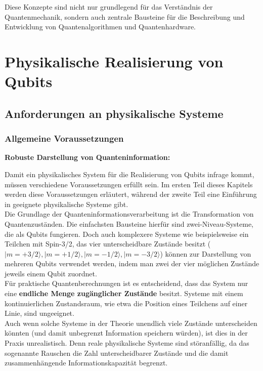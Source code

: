 Diese Konzepte sind nicht nur grundlegend für das Verständnis der Quantenmechanik, sondern auch zentrale Bausteine für die Beschreibung und Entwicklung von Quantenalgorithmen und Quantenhardware.

\section{Physikalische Realisierung von Qubits }
\subsection{Anforderungen an physikalische Systeme }
\subsubsection{Allgemeine Voraussetzungen}

\textbf{Robuste Darstellung von Quanteninformation:}

Damit ein physikalisches System für die Realisierung von Qubits infrage kommt, müssen verschiedene Voraussetzungen erfüllt sein. Im ersten Teil dieses Kapitels werden diese Voraussetzungen erläutert, während der zweite Teil eine Einführung in geeignete physikalische Systeme gibt.\\

 
Die Grundlage der Quanteninformationsverarbeitung ist die Transformation von Quantenzuständen. Die einfachsten Bausteine hierfür sind zwei-Niveau-Systeme, die als Qubits fungieren. Doch auch komplexere Systeme wie beispielsweise ein Teilchen mit Spin-3/2, das vier unterscheidbare Zustände besitzt ($|m = +3/2\rangle, |m = +1/2\rangle, |m = -1/2\rangle, |m = -3/2\rangle$) 
können zur Darstellung von mehreren Qubits verwendet werden, 
indem man zwei der vier möglichen Zustände jeweils einem Qubit zuordnet.\\

Für praktische Quantenberechnungen ist es entscheidend, dass das System nur eine \textbf{endliche Menge zugänglicher Zustände} besitzt. Systeme mit einem kontinuierlichen Zustandsraum, wie etwa die Position eines Teilchens auf einer Linie, sind ungeeignet. \\
Auch wenn solche Systeme in der Theorie unendlich viele Zustände unterscheiden könnten (und damit unbegrenzt Information speichern würden), ist dies in der Praxis unrealistisch. Denn reale physikalische Systeme sind störanfällig, da das sogenannte Rauschen die Zahl unterscheidbarer Zustände und die damit zusammenhängende Informationskapazität begrenzt. \\

